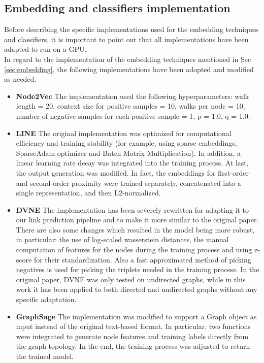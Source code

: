 \subsection{Embedding and classifiers implementation}
Before describing the specific implementations used for the embedding techniques and classifiers, it is important to point out that all implementations have been adapted to run on a GPU.
\\\newline
In regard to the implementation of the embedding techniques mentioned in Sec \ref{sec:embedding}, the following implementations have been adopted and modified as needed.
\begin{itemize}
    \item \textbf{Node2Vec} \cite{Node2VecImpl1, Node2VecImpl2} The implementation used the following hyperparameters: 
    walk length = 20, 
    context size for positive samples = 10, 
    walks per node = 10, 
    number of negative samples for each positive sample = 1, 
    p = 1.0, 
    q = 1.0.
    \item \textbf{LINE} \cite{LINEImpl} The original implementation was optimized for computational efficiency and training stability (for example, using sparse embeddings, SparseAdam optimizer and Batch Matrix Multiplication). 
    In addition, a linear learning rate decay was integrated into the training process. 
    At last, the output generation was modified. 
    In fact, the embeddings for first-order and second-order proximity were trained separately, concatenated into a single representation, and then L2-normalized.
    \item \textbf{DVNE} \cite{DVNEImpl} The implementation has been severely rewritten for adapting it to our link prediction pipeline and to make it more similar to the original paper.
    There are also some changes which resulted in the model being more robust, in particular: the use of log-scaled wasserstein distances, the manual computation of features for the nodes during the training process and using z-score for their standardization. 
    Also a fast approximated method of picking negatives is used for picking the triplets needed in the training process.
    In the original paper, DVNE was only tested on undirected graphs, while in this work it has been applied to both directed and undirected graphs without any specific adaptation.
    \item \textbf{GraphSage} \cite{GraphSageImpl} The implementation was modified to support a Graph object as input instead of the original text-based format. 
    In particular, two functions were integrated to generate node features and training labels directly from the graph topology.
    In the end, the training process was adjusted to return the trained model.
\end{itemize}
